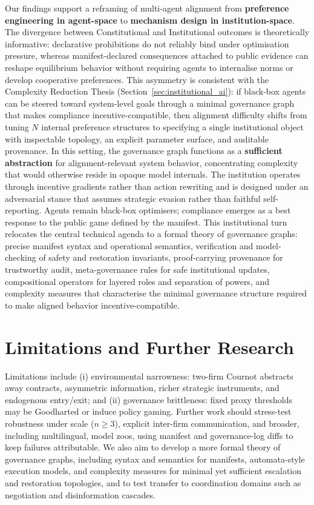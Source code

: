 \documentclass[11pt, a4paper]{article}
\begin{document}
Our findings support a reframing of multi-agent alignment from \textbf{preference engineering in agent-space} to \textbf{mechanism design in institution-space}. The divergence between Constitutional and Institutional outcomes is theoretically informative: declarative prohibitions do not reliably bind under optimisation pressure, whereas manifest-declared consequences attached to public evidence can reshape equilibrium behavior without requiring agents to internalise norms or develop cooperative preferences. This asymmetry is consistent with the Complexity Reduction Thesis (Section~\ref{sec:institutional_ai}): if black-box agents can be steered toward system-level goals through a minimal governance graph that makes compliance incentive-compatible, then alignment difficulty shifts from tuning $N$ internal preference structures to specifying a single institutional object with inspectable topology, an explicit parameter surface, and auditable provenance. In this setting, the governance graph functions as a \textbf{sufficient abstraction} for alignment-relevant system behavior, concentrating complexity that would otherwise reside in opaque model internals. The institution operates through incentive gradients rather than action rewriting and is designed under an adversarial stance that assumes strategic evasion rather than faithful self-reporting. Agents remain black-box optimisers; compliance emerges as a best response to the public game defined by the manifest. This institutional turn relocates the central technical agenda to a formal theory of governance graphs: precise manifest syntax and operational semantics, verification and model-checking of safety and restoration invariants, proof-carrying provenance for trustworthy audit, meta-governance rules for safe institutional updates, compositional operators for layered roles and separation of powers, and complexity measures that characterise the minimal governance structure required to make aligned behavior incentive-compatible.

\section{Limitations and Further Research}
\label{sec:further_research}

Limitations include (i) environmental narrowness: two-firm Cournot abstracts away contracts, asymmetric information, richer strategic instruments, and endogenous entry/exit; and (ii) governance brittleness: fixed proxy thresholds may be Goodharted or induce policy gaming. Further work should stress-test robustness under scale ($n \ge 3$), explicit inter-firm communication, and broader, including multilingual, model zoos, using manifest and governance-log diffs to keep failures attributable. We also aim to develop a more formal theory of governance graphs, including syntax and semantics for manifests, automata-style execution models, and complexity measures for minimal yet sufficient escalation and restoration topologies, and to test transfer to coordination domains such as negotiation and disinformation cascades.
\end{document}
